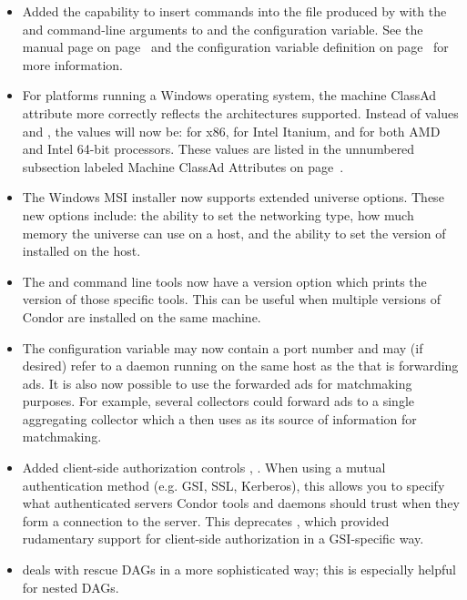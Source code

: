 \begin{itemize}

\item Added the capability to insert commands into the 
  file produced by  with the  and
   command-line arguments to  and
  the  configuration variable.
  See the  manual page on
  page~\pageref{man-condor-submit-dag}
  and the configuration variable definition on
  page~\pageref{param:DAGManInsertSubFile} for more information.

\item For platforms running a Windows operating system, the 
  machine ClassAd attribute more correctly reflects the architectures
  supported.  Instead of values  and ,
  the values will now be:  for x86,
   for Intel Itanium,
  and  for both AMD and Intel 64-bit processors.
  These values are listed in the unnumbered subsection labeled
  Machine ClassAd Attributes on page~\pageref{sec:Machine-ClassAd-Attributes}.

\item The Windows MSI installer now supports extended  universe 
  options. These new options include: the ability to set the 
  networking type, how much memory the  universe can use 
  on a host, and
  the ability to set the version of  installed on the host.

\item The  and  command line tools now have a
  version option which prints the version of those specific tools.  This
  can be useful when multiple versions of Condor are installed on the
  same machine.

\item The configuration variable  may now
  contain a port number and may (if desired) refer to a
   daemon running on the same host as the
   that is forwarding ads.  It is also now possible to
  use the forwarded ads for matchmaking purposes.  For example, several
  collectors could forward ads to a single aggregating collector which
  a  then uses as its source of information for
  matchmaking.

\item Added client-side authorization controls
, .  When using a mutual
authentication method (e.g. GSI, SSL, Kerberos), this allows you to
specify what authenticated servers Condor tools and daemons should
trust when they form a connection to the server.  This deprecates
, which provided rudamentary support for
client-side authorization in a GSI-specific way.

\item {} deals with rescue DAGs in a more sophisticated
way; this is especially helpful for nested DAGs.

\end{itemize}

